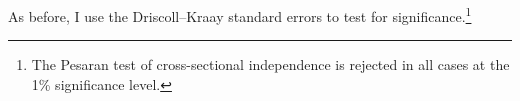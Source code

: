{%
As before, I use the Driscoll--Kraay  standard errors to test for significance.\footnote{ The Pesaran test of cross-sectional independence is rejected in all cases at the 1\% significance level.} %


}
